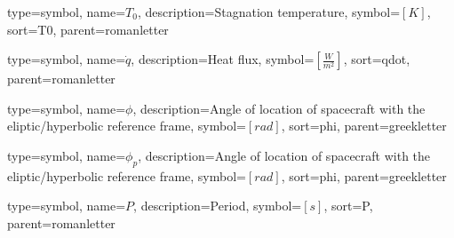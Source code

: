 {
	type=symbol, %
	name={\ensuremath{T_0}}, %
	description={Stagnation temperature}, %
	symbol={$\left[K\right]$}, %
	sort=T0, %
	parent=romanletter %
}
	
{
	type=symbol, %
	name={\ensuremath{\dot{q}}}, %
	description={Heat flux}, %
	symbol={$\left[ \frac{W}{m^2} \right]$}, %
	sort=qdot, %
	parent=romanletter %
}

{
type=symbol, %
name={\ensuremath{\phi}}, %
description={Angle of location of spacecraft with the eliptic/hyperbolic reference frame}, %
symbol={$\left[rad\right]$}, %
sort=phi, %
parent=greekletter %
}

{
type=symbol, %
name={\ensuremath{\phi_p}}, %
description={Angle of location of spacecraft with the eliptic/hyperbolic reference frame}, %
symbol={$\left[rad\right]$}, %
sort=phi, %
parent=greekletter %
}

{
	type=symbol, %
	name={\ensuremath{P}}, %
	description={Period}, %
	symbol={$\left[s\right]$}, %
	sort=P, %
	parent=romanletter %
}

